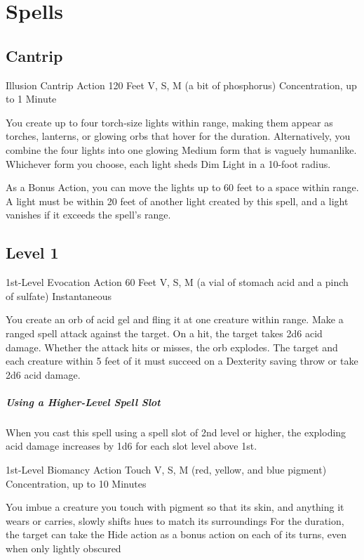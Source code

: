 \documentclass[letterpaper,openany,oneside,twocolumn]{book}
\begin{document}
\section*{Spells}
\subsection*{Cantrip}

	{Illusion Cantrip}
	{Action}
	{120 Feet}
	{V, S, M (a bit of phosphorus)}
	{Concentration, up to 1 Minute}

You create up to four torch-size lights within range, making them appear as torches, lanterns, or glowing orbs that hover for the duration. Alternatively, you combine the four lights into one glowing Medium form that is vaguely humanlike. Whichever form you choose, each light sheds Dim Light in a 10-foot radius.

As a Bonus Action, you can move the lights up to 60 feet to a space within range. A light must be within 20 feet of another light created by this spell, and a light vanishes if it exceeds the spell's range.

\subsection*{Level 1}

	{1st-Level Evocation}
	{Action}
	{60 Feet}
	{V, S, M (a vial of stomach acid and a pinch of sulfate)}
	{Instantaneous}

You create an orb of acid gel and fling it at one creature within range. Make a ranged spell attack against the target. On a hit, the target takes 2d6 acid damage. Whether the attack hits or misses, the orb explodes. The target and each creature within 5 feet of it must succeed on a Dexterity saving throw or take 2d6 acid damage.

\subparagraph*{Using a Higher-Level Spell Slot} When you cast this spell using a spell slot of 2nd level or higher, the exploding acid damage increases by 1d6 for each slot level above 1st.

	{1st-Level Biomancy}
	{Action}
	{Touch}
	{V, S, M (red, yellow, and blue pigment)}
	{Concentration, up to 10 Minutes}

You imbue a creature you touch with pigment so that its skin, and anything it wears or carries, slowly shifts hues to match its surroundings For the duration, the target can take the Hide action as a bonus action on each of its turns, even when only lightly obscured
\end{document}
